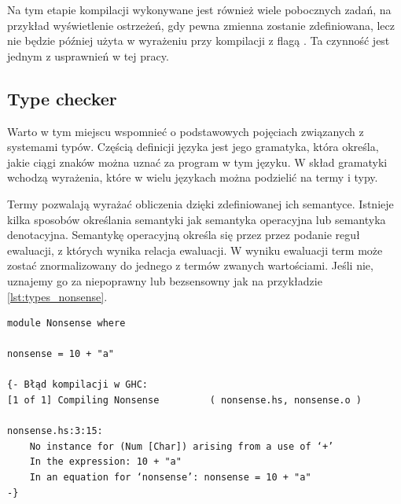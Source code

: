 {Na tym etapie kompilacji wykonywane jest również wiele pobocznych zadań, na
przykład wyświetlenie ostrzeżeń, gdy pewna zmienna zostanie zdefiniowana, lecz
nie będzie później użyta w wyrażeniu przy kompilacji z flagą
. Ta czynność jest jednym z usprawnień w tej pracy.

\subsection{Type checker}\label{sec:type_checker}

Warto w tym miejscu wspomnieć o podstawowych pojęciach związanych z systemami
typów. Częścią definicji języka jest jego gramatyka, która określa, jakie ciągi
znaków można uznać za program w tym języku. W skład gramatyki wchodzą wyrażenia,
które w wielu językach można podzielić na termy i typy.

Termy pozwalają wyrażać obliczenia dzięki zdefiniowanej ich semantyce. Istnieje
kilka sposobów określania semantyki jak semantyka operacyjna lub semantyka
denotacyjna.
Semantykę operacyjną określa się przez przez podanie reguł
ewaluacji, z których wynika relacja ewaluacji. W wyniku ewaluacji term może
zostać znormalizowany do jednego z termów zwanych wartościami. Jeśli nie,
uznajemy go za niepoprawny lub bezsensowny\cite{TAPL} jak na przykładzie
\ref{lst:types_nonsense}.

\begin{lstlisting}[float,label={lst:types_nonsense},
                   caption={Przykład bezsensownego wyrażenia w programie, z błędem GHC, który wywołuje.}]
module Nonsense where

nonsense = 10 + "a"

{- Błąd kompilacji w GHC:
[1 of 1] Compiling Nonsense         ( nonsense.hs, nonsense.o )

nonsense.hs:3:15:
    No instance for (Num [Char]) arising from a use of ‘+’
    In the expression: 10 + "a"
    In an equation for ‘nonsense’: nonsense = 10 + "a"
-}
\end{lstlisting}

}
